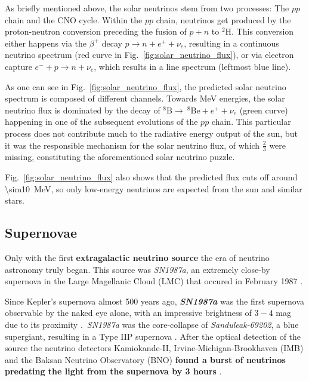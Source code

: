 As briefly mentioned above, the solar neutrinos stem from two processes: The $pp$ chain and the CNO cycle. Within the $pp$ chain, neutrinos get produced by the proton-neutron conversion preceding the fusion of $p+n$ to $^2 \text{H}$. This conversion either happens via the $\beta^+$ decay $p \rightarrow n + e^+ + \nu_e$, resulting in a continuous neutrino spectrum (red curve in Fig.~\ref{fig:solar_neutrino_flux}), or via electron capture $e^- + p \rightarrow n + \nu_e$, which results in a line spectrum (leftmost blue line).

As one can see in Fig.~\ref{fig:solar_neutrino_flux}, the predicted solar neutrino spectrum is composed of different channels. Towards \unit{\mega\eV} energies, the solar neutrino flux is dominated by the decay of $^8\text{B}\rightarrow ~^8\text{Be} + e^+ + \nu_e$ (green curve) happening in one of the subsequent evolutions of the $pp$ chain. This particular process does not contribute much to the radiative energy output of the sun, but it was the responsible mechanism for the solar neutrino flux, of which $\frac{2}{3}$ were missing, constituting the aforementioned solar neutrino puzzle.

Fig.~\ref{fig:solar_neutrino_flux} also shows that the predicted flux cuts off around \SI{\sim10}{\mega\eV}, so only low-energy neutrinos are expected from the sun and similar stars.

\subsection{Supernovae}\label{sne}
Only with the first \textbf{extragalactic neutrino source} the era of neutrino astronomy truly began. This source was \emph{SN1987a}, an extremely close-by supernova in the Large Magellanic Cloud (LMC) that occured in February 1987 .

Since Kepler's supernova almost 500 years ago, \textbf{\emph{SN1987a}} was the first supernova observable by the naked eye alone, with an impressive brightness of $3-4$ mag due to its proximity .\ \emph{SN1987a} was the core-collapse of \emph{Sanduleak-69202}, a blue supergiant, resulting in a Type IIP supernova . After the optical detection of the source the neutrino detectors Kamiokande-II, Irvine-Michigan-Brookhaven (IMB) and the Baksan Neutrino Observatory (BNO) \textbf{found a burst of neutrinos predating the light from the supernova by 3 hours} .

